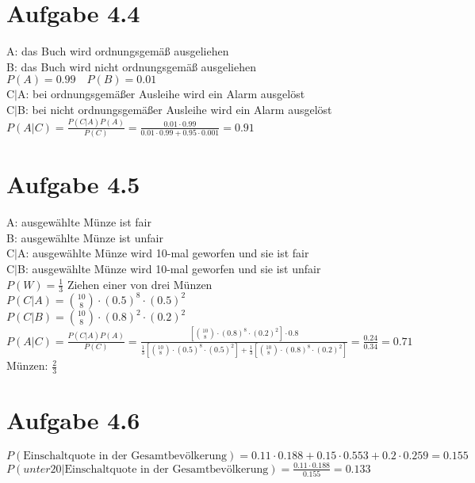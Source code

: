\documentclass{article}
\begin{document}
	\section*{Aufgabe 4.4}
	A: das Buch wird ordnungsgemäß ausgeliehen \\
	B: das Buch wird nicht ordnungsgemäß ausgeliehen \\
	\newline
	$P(A) = 0.99 \quad P(B) = 0.01$ \\
	\newline
	C$|$A: bei ordnungsgemäßer Ausleihe wird ein Alarm ausgelöst \\
	C$|$B: bei nicht ordnungsgemäßer Ausleihe wird ein Alarm ausgelöst \\
	\newline
	$P(A|C) = \frac{P(C|A)P(A)}{P(C)} = \frac{0.01 \cdot 0.99}{0.01 \cdot 0.99 + 0.95 \cdot 0.001} = 0.91 $
	\pagebreak
	\section*{Aufgabe 4.5}
	A: ausgewählte Münze ist fair \\
	B: ausgewählte Münze ist unfair \\
	\newline
	C$|$A: ausgewählte Münze wird 10-mal geworfen und sie ist fair \\
	C$|$B: ausgewählte Münze wird 10-mal geworfen und sie ist unfair \\
	\newline
	$P(W) = \frac{1}{3}$ Ziehen einer von drei Münzen \\
	\newline
	$P(C|A) = \binom{10}{8} \cdot (0.5)^8 \cdot (0.5)^2$ \\
	\newline
	$P(C|B) = \binom{10}{8} \cdot (0.8)^2 \cdot (0.2)^2$ \\
	\newline
	$P(A|C) = \frac{P(C|A)P(A)}{P(C)} = \frac{[\binom{10}{8} \cdot (0.8)^8 \cdot (0.2)^2] \cdot 0.8 }{\frac{1}{3}[\binom{10}{8} \cdot (0.5)^8 \cdot (0.5)^2]+ \frac{1}{3}[\binom{10}{8} \cdot (0.8)^8 \cdot (0.2)^2]} = \frac{0.24}{0.34} = 0.71$ \\
	 Münzen: $\frac{2}{3}$
	
	\section*{Aufgabe 4.6}
	$P(\text{Einschaltquote in der Gesamtbevölkerung}) = 0.11 \cdot 0.188 + 0.15 \cdot 0.553 + 0.2 \cdot 0.259 = 0.155$ \\
	\newline
	$P(unter 20 | \text{Einschaltquote in der Gesamtbevölkerung}) = \frac{0.11 \cdot 0.188}{0.155} = 0.133$
	
\end{document}
